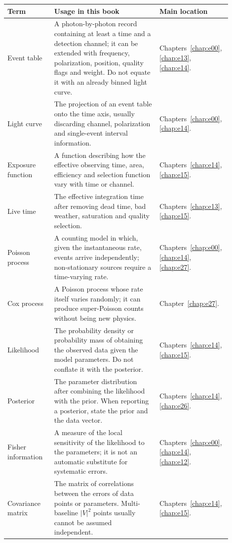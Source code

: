 \begin{longtable}{p{0.20\linewidth}p{0.45\linewidth}p{0.25\linewidth}}
\toprule
Term & Usage in this book & Main location \\
\midrule
Event table & A photon-by-photon record containing at least a time and a detection channel; it can be extended with frequency, polarization, position, quality flags and weight. Do not equate it with an already binned light curve. & Chapters~\ref{chap:e00}, \ref{chap:e13}, \ref{chap:e14}. \\
Light curve & The projection of an event table onto the time axis, usually discarding channel, polarization and single-event interval information. & Chapters~\ref{chap:e00}, \ref{chap:e14}. \\
Exposure function & A function describing how the effective observing time, area, efficiency and selection function vary with time or channel. & Chapters~\ref{chap:e14}, \ref{chap:e15}. \\
Live time & The effective integration time after removing dead time, bad weather, saturation and quality selection. & Chapters~\ref{chap:e13}, \ref{chap:e15}. \\
Poisson process & A counting model in which, given the instantaneous rate, events arrive independently; non-stationary sources require a time-varying rate. & Chapters~\ref{chap:e00}, \ref{chap:e14}, \ref{chap:e27}. \\
Cox process & A Poisson process whose rate itself varies randomly; it can produce super-Poisson counts without being new physics. & Chapter~\ref{chap:e27}. \\
Likelihood & The probability density or probability mass of obtaining the observed data given the model parameters. Do not conflate it with the posterior. & Chapters~\ref{chap:e14}, \ref{chap:e15}. \\
Posterior & The parameter distribution after combining the likelihood with the prior. When reporting a posterior, state the prior and the data vector. & Chapters~\ref{chap:e14}, \ref{chap:e26}. \\
Fisher information & A measure of the local sensitivity of the likelihood to the parameters; it is not an automatic substitute for systematic errors. & Chapters~\ref{chap:e00}, \ref{chap:e14}, \ref{chap:e12}. \\
Covariance matrix & The matrix of correlations between the errors of data points or parameters. Multi-baseline \(|V|^2\) points usually cannot be assumed independent. & Chapters~\ref{chap:e14}, \ref{chap:e15}. \\

\end{longtable}
